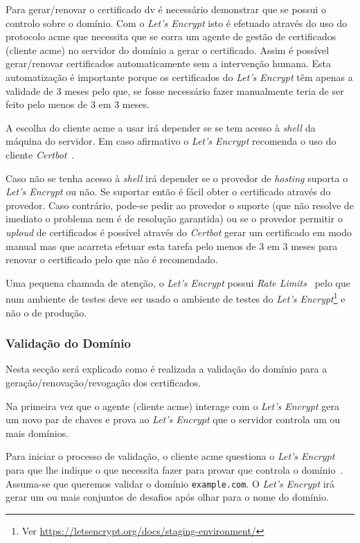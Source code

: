 Para gerar/renovar o certificado \acrshort{dv} é necessário demonstrar que se possui o controlo sobre o domínio. Com o \textit{Let's Encrypt} isto é efetuado através do uso do protocolo \acrfull{acme} que necessita que se corra um agente de gestão de certificados (cliente \acrshort{acme}) no servidor do domínio a gerar o certificado. Assim é possível gerar/renovar certificados automaticamente sem a intervenção humana. Esta automatização é importante porque os certificados do \textit{Let's Encrypt} têm apenas a validade de 3 meses pelo que, se fosse necessário fazer manualmente teria de ser feito pelo menos de 3 em 3 meses.

A escolha do cliente \acrshort{acme} a usar irá depender se se tem acesso à \textit{shell} da máquina do servidor. Em caso afirmativo o \textit{Let's Encrypt} recomenda o uso do cliente \textit{Certbot}~\cite{letEnc}.

Caso não se tenha acesso à \textit{shell} irá depender se o provedor de \textit{hosting} suporta o \textit{Let's Encrypt} ou não. Se suportar então é fácil obter o certificado através do provedor. Caso contrário, pode-se pedir ao provedor o suporte (que não resolve de imediato o problema nem é de resolução garantida) ou se o provedor permitir o \textit{uploud} de certificados é possível através do \textit{Certbot} gerar um certificado em modo manual mas que acarreta efetuar esta tarefa pelo menos de 3 em 3 meses para renovar o certificado pelo que não é recomendado.

Uma pequena chamada de atenção, o \textit{Let's Encrypt} possui \textit{Rate Limits}~\cite{LErateLimits} pelo que num ambiente de testes deve ser usado o ambiente de testes do \textit{Let's Encrypt}\footnote{Ver \url{https://letsencrypt.org/docs/staging-environment/}} e não o de produção.

\subsubsection{Validação do Domínio}\label{sec:valDom}

Nesta secção será explicado como é realizada a validação do domínio para a geração/renovação/revogação dos certificados.

Na primeira vez que o agente (cliente \acrshort{acme}) interage com o \textit{Let's Encrypt} gera um novo par de chaves e prova ao \textit{Let's Encrypt} que o servidor controla um ou mais domínios.~\cite{domainValidation}

Para iniciar o processo de validação, o cliente \acrshort{acme} questiona o \textit{Let's Encrypt} para que lhe indique o que necessita fazer para provar que controla o domínio~\cite{domainValidation}. Assuma-se que queremos validar o domínio \texttt{example.com}.
O \textit{Let's Encrypt} irá gerar um ou mais conjuntos de desafios após olhar para o nome do domínio.

